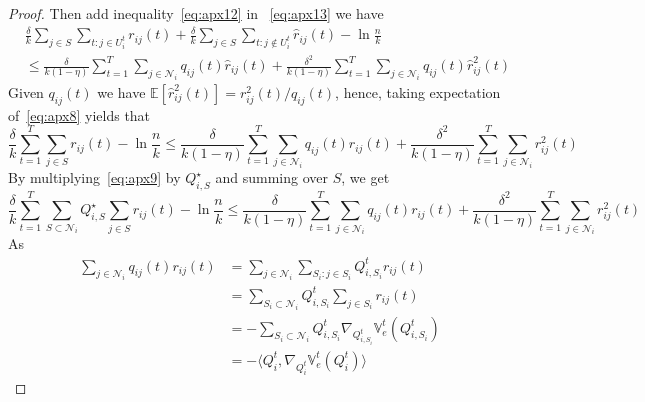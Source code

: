 \documentclass{article}
\begin{document}
\begin{proof}
Then add inequality~\eqref{eq:apx12} in ~\eqref{eq:apx13} we have
{\footnotesize
\begin{align}\label{eq:apx8}
&	\frac{\delta}{k}\sum_{j\in S}\sum_{t:j\in U_i^t}r_{ij}(t) + \frac{\delta}{k}\sum_{j\in S}\sum_{t:j\notin U_i^t}\hat{r}_{ij}(t) - \ln\frac{n}{k} \\
& \leq \frac{\delta}{k(1-\eta)}\sum_{t=1}^T\sum_{j\in\mathcal{N}_i}q_{ij}(t)\hat{r}_{ij}(t) + \frac{\delta^2}{k(1-\eta)}\sum_{t=1}^T\sum_{j\in\mathcal{N}_i}q_{ij}(t)\hat{r}_{ij}^2(t) 
\end{align}
}
Given $q_{ij}(t)$ we have $\mathbb{E}[\hat{r}_{ij}^2(t)]=r_{ij}^2(t)/q_{ij}(t)$, hence, taking expectation of~\eqref{eq:apx8} yields that
{\footnotesize
\begin{equation}
	\frac{\delta}{k}\sum_{t=1}^T\sum_{j\in S}r_{ij}(t) - \ln\frac{n}{k}\leq \frac{\delta}{k(1-\eta)}\sum_{t=1}^T\sum_{j\in\mathcal{N}_i}q_{ij}(t) r_{ij}(t) + \frac{\delta^2}{k(1-\eta)}\sum_{t=1}^T\sum_{j\in\mathcal{N}_i}r_{ij}^2(t) \label{eq:apx9}
\end{equation}
}
By multiplying~\eqref{eq:apx9} by $Q_{i,S}^{\star}$ and summing over $S$, we get
{\footnotesize
\begin{equation}
	\frac{\delta}{k}\sum_{t=1}^T\sum_{S\subset\mathcal{N}_i} Q_{i,S}^{\star}\sum_{j\in S}r_{ij}(t) - \ln\frac{n}{k}\leq \frac{\delta}{k(1-\eta)}\sum_{t=1}^T\sum_{j\in\mathcal{N}_i}q_{ij}(t) r_{ij}(t) + \frac{\delta^2}{k(1-\eta)}\sum_{t=1}^T\sum_{j\in\mathcal{N}_i}r_{ij}^2(t) \label{eq:apx10}
\end{equation}
}
As
{\footnotesize
\begin{align}
	\sum_{j\in\mathcal{N}_i}q_{ij}(t) r_{ij}(t)&=\sum_{j\in\mathcal{N}_i}\sum_{S_i:j\in S_i}Q_{i,S_i}^t r_{ij}(t) \\
	&= \sum_{S_i\subset\mathcal{N}_i}Q_{i,S_i}^t\sum_{j\in S_i}r_{ij}(t) \\
	&= -\sum_{S_i\subset\mathcal{N}_i}Q_{i,S_i}^t\nabla_{Q_{i,S_i}^t}\mathbb{V}_e^t(Q_{i,S_i}^t) \\
	&= -\langle Q_{i}^t,\nabla_{Q_i^t}\mathbb{V}_e^t(Q_{i}^t)\rangle \label{eq:apx15}
\end{align}
}


\end{proof}
\end{document}
